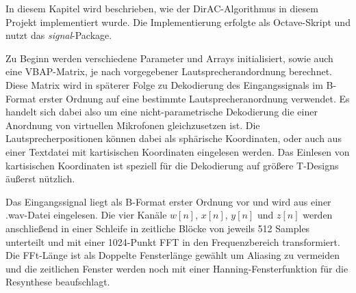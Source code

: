In diesem Kapitel wird beschrieben, wie der DirAC-Algorithmus in diesem Projekt implementiert wurde. Die Implementierung erfolgte als Octave-Skript und nutzt das \textit{signal}-Package.

Zu Beginn werden verschiedene Parameter und Arrays initialisiert, sowie auch eine VBAP-Matrix, je nach vorgegebener Lautsprecherandordnung berechnet. Diese Matrix wird in späterer Folge zu Dekodierung des Eingangssignals im B-Format erster Ordnung auf eine bestimmte Lautsprecheranordnung verwendet. Es handelt sich dabei also um eine nicht-parametrische Dekodierung die einer Anordnung von virtuellen Mikrofonen gleichzusetzen ist. Die Lautsprecherpositionen können dabei als sphärische Koordinaten, oder auch aus einer Textdatei mit kartisischen Koordinaten eingelesen werden. Das Einlesen von kartisischen Koordinaten ist speziell für die Dekodierung auf größere T-Designs äußerst nützlich.

Das Eingangssignal liegt als B-Format erster Ordnung vor und wird aus einer .wav-Datei eingelesen. Die vier Kanäle $w[n]$, $x[n]$, $y[n]$ und $z[n]$ werden anschließend in einer Schleife in zeitliche Blöcke von jeweils 512 Samples unterteilt und mit einer 1024-Punkt FFT in den Frequenzbereich transformiert. Die FFt-Länge ist als Doppelte Fensterlänge gewählt um Aliasing zu vermeiden und die zeitlichen Fenster werden noch mit einer Hanning-Fensterfunktion für die Resynthese beaufschlagt.